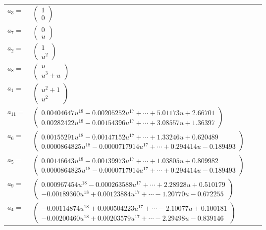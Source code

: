 \documentclass[1p]{elsarticle_modified}
\theoremstyle{definition}
\begin{document}
\begin{tabular}{m{7pt} m{180pt} m{7pt} m{180pt} }
\flushright $a_{3}=$&$\begin{pmatrix}1\\0\end{pmatrix}$ \\
\flushright $a_{7}=$&$\begin{pmatrix}0\\u\end{pmatrix}$ \\
\flushright $a_{2}=$&$\begin{pmatrix}1\\u^2\end{pmatrix}$ \\
\flushright $a_{8}=$&$\begin{pmatrix}u\\u^3+u\end{pmatrix}$ \\
\flushright $a_{1}=$&$\begin{pmatrix}u^2+1\\u^2\end{pmatrix}$ \\
\flushright $a_{11}=$&$\begin{pmatrix}0.00404647 u^{18}-0.00205252 u^{17}+\cdots+5.01173 u+2.66701\\0.00282422 u^{18}-0.00154396 u^{17}+\cdots+3.08557 u+1.36397\end{pmatrix}$ \\
\flushright $a_{6}=$&$\begin{pmatrix}0.00155291 u^{18}-0.00147152 u^{17}+\cdots+1.33246 u+0.620489\\0.0000864825 u^{18}-0.0000717914 u^{17}+\cdots+0.294414 u-0.189493\end{pmatrix}$ \\
\flushright $a_{5}=$&$\begin{pmatrix}0.00146643 u^{18}-0.00139973 u^{17}+\cdots+1.03805 u+0.809982\\0.0000864825 u^{18}-0.0000717914 u^{17}+\cdots+0.294414 u-0.189493\end{pmatrix}$ \\
\flushright $a_{9}=$&$\begin{pmatrix}0.000967454 u^{18}-0.000263588 u^{17}+\cdots+2.28928 u+0.510179\\-0.00189360 u^{18}+0.00123884 u^{17}+\cdots-1.20770 u-0.672255\end{pmatrix}$ \\
\flushright $a_{4}=$&$\begin{pmatrix}-0.00114874 u^{18}+0.000504223 u^{17}+\cdots-2.10077 u+0.100181\\-0.00200460 u^{18}+0.00203579 u^{17}+\cdots-2.29498 u-0.839146\end{pmatrix}$ \\

\end{tabular}
\end{document}
